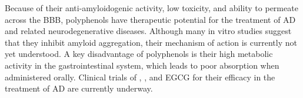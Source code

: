 


Because of their anti-amyloidogenic activity, low toxicity, and ability to permeate across the BBB, polyphenols have therapeutic potential for the treatment of AD and related neurodegenerative diseases.  Although many in vitro studies suggest that they inhibit amyloid aggregation, their mechanism of action is currently not yet understood. A key disadvantage of polyphenols is their high metabolic activity in the gastrointestinal system, which leads to poor absorption when administered orally.\cite{Baur:2006bx,Smith:2011iq,Hamaguchi:2010wu} Clinical trials of  \cur, \resve, and EGCG for their efficacy in the treatment of AD are currently underway.



